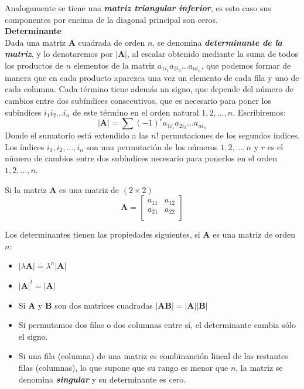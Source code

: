 \documentclass[12pt,letterpaper]{report} %
\begin{document}
Analogamente se tiene una \textit{\textbf{matriz triangular inferior}}, es esto caso sus componentes por encima de la diagonal principal son ceros.
\\

\textbf{Determinante}
\\

Dada una matriz $\mathbf{A}$ cuadrada de orden $n$, se denomina \textit{\textbf{determinante de la matriz}}, y lo denotaremos por $|\mathbf{A}|$, al escalar obtenido mediante la suma de todos los productos de $n$ elementos de la matriz $a_{1i_1}a_{2i_2}...a_{ni_n}$, que podemos formar de manera que en cada producto aparezca una vez un elemento de cada fila y uno de cada columna. Cada término tiene además un signo, que depende del número de cambios entre dos subíndices consecutivos, que es necesario para poner los subíndices $i_1 i_2 ... i_n$ de este término en el orden natural $1,2,...,n$. Escribiremos:
$$|\mathbf{A}|=\sum (-1)^r a_{1i_1}a_{2i_2}...a_{ni_n}$$
Donde el sumatorio está extendido a las $n!$ permutaciones de los segundos índices. Los índices $i_1,i_2,...,i_n$ son una permutación de los números $1,2,...,n$ y $r$ es el número de cambios entre dos subíndices necesario para ponerlos en el orden $1,2,...,n$.

Si la matriz $\mathbf{A}$ es una matriz de $(2 \times 2)$
$$
\mathbf{A}=
\begin{bmatrix}
a_{11} & a_{12} \\
a_{21} & a_{22} \\
\end{bmatrix}
$$

Los determinantes tienen las propiedades siguientes, si $\mathbf{A}$ es una matriz de orden $n$:
\begin{itemize}
\item $|\lambda \mathbf{A}|=\lambda^n|\mathbf{A}|$
\item $|\mathbf{A}|^t=|\mathbf{A}|$
\item Si $\mathbf{A}$ y $\mathbf{B}$ son dos matrices cuadradas $|\mathbf{A}\mathbf{B}|=|\mathbf{A}||\mathbf{B}|$
\item Si permutamos dos filas o dos columnas entre sí, el determinante cambia sólo el signo.
\item Si una fila (columna) de una matriz es combinanción lineal de las restantes filas (columnas), lo que supone que su rango es menor que $n$, la matriz se denomina \textit{\textbf{singular}} y su determinante es cero.	
\end{itemize}
\end{document}
